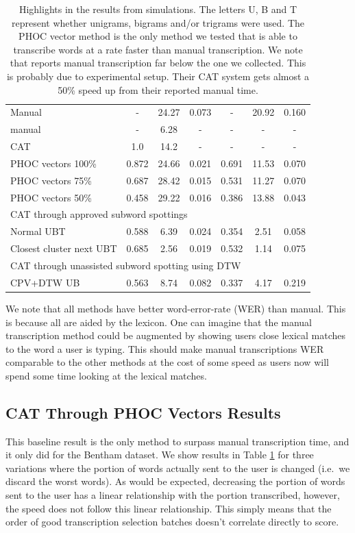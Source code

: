 \documentclass[ms,electronic,twosidetoc,letterpaper,chaptercenter,parttop,lof,lot]{byumsphd}
\begin{document}
\begin{table}
\begin{tabular}{| l | c  c  c | c c c |}
  Manual             & -   & 24.27 & 0.073 &  -   & 20.92 & 0.160 \\
  \cite{Zagoris2015} manual & -   & 6.28 & - &  -   & -& - \\
  \cite{Zagoris2015} CAT & 1.0   & 14.2 & - &  -   & -& - \\
  \hline	
  PHOC vectors 100\% & 0.872 & 24.66 & 0.021 &  0.691 & 11.53 & 0.070 \\
  PHOC vectors 75\%  & 0.687 & 28.42 & 0.015 &  0.531 & 11.27 & 0.070 \\
  PHOC vectors 50\%  & 0.458 & 29.22 & 0.016 &  0.386 & 13.88 & 0.043 \\
  \hline	
  \multicolumn{7}{|l|}{CAT through approved subword spottings} \\
  Normal UBT & 0.588 & 6.39 & 0.024 &  0.354 & 2.51 & 0.058 \\
  Closest cluster next UBT & 0.685 & 2.56 & 0.019 & 0.532 & 1.14 & 0.075 \\
  \hline	
  \multicolumn{7}{|l|}{CAT through unassisted subword spotting using DTW} \\
  CPV+DTW UB & 0.563 & 8.74 & 0.082 & 0.337 & 4.17 & 0.219  \\
  \hline  
\end{tabular}
\caption{Highlights in the results from simulations. The letters U, B and T represent whether unigrams, bigrams and/or trigrams were used. The PHOC vector method is the only method we tested that is able to transcribe words at a rate faster than manual transcription. We note that \cite{Zagoris2015} reports manual transcription far below the one we collected. This is probably due to experimental setup. Their CAT system gets almost a 50\% speed up from their reported manual time.}
\label{tab:finalresults}
\end{table}

We note that all methods have better word-error-rate (WER) than manual. This is because all are aided by the lexicon. One can imagine that the manual transcription method could be augmented by showing users close lexical matches to the word a user is typing. This should make manual transcriptions WER comparable to the other methods at the cost of some speed as users now will spend some time looking at the lexical matches.


\subsection{CAT Through PHOC Vectors Results}
This baseline result is the only method to surpass manual transcription time, and it only did for the Bentham dataset. We show results in Table \ref{tab:finalresults} for three variations where the portion of words actually sent to the user is changed (i.e.~we discard the worst words). As would be expected, decreasing the portion of words sent to the user has a linear relationship with the portion transcribed, however, the speed does not follow this linear relationship. This simply means that the order of good transcription selection batches doesn't correlate directly to score.
\end{document}
